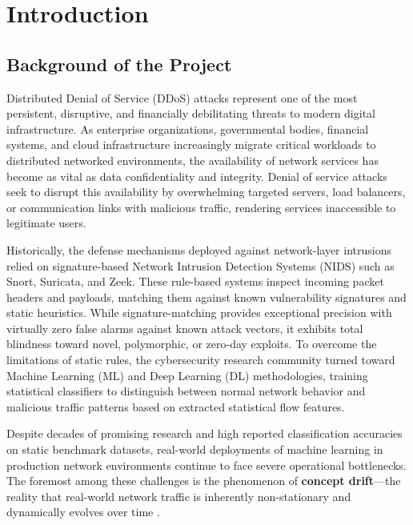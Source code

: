 \documentclass[12pt,a4paper,oneside]{report}
\begin{document}
\chapter{Introduction}
\label{chap:introduction}

\section{Background of the Project}
Distributed Denial of Service (DDoS) attacks represent one of the most persistent, disruptive, and financially debilitating threats to modern digital infrastructure. As enterprise organizations, governmental bodies, financial systems, and cloud infrastructure increasingly migrate critical workloads to distributed networked environments, the availability of network services has become as vital as data confidentiality and integrity. Denial of service attacks seek to disrupt this availability by overwhelming targeted servers, load balancers, or communication links with malicious traffic, rendering services inaccessible to legitimate users.

Historically, the defense mechanisms deployed against network-layer intrusions relied on signature-based Network Intrusion Detection Systems (NIDS) such as Snort, Suricata, and Zeek. These rule-based systems inspect incoming packet headers and payloads, matching them against known vulnerability signatures and static heuristics. While signature-matching provides exceptional precision with virtually zero false alarms against known attack vectors, it exhibits total blindness toward novel, polymorphic, or zero-day exploits. To overcome the limitations of static rules, the cybersecurity research community turned toward Machine Learning (ML) and Deep Learning (DL) methodologies, training statistical classifiers to distinguish between normal network behavior and malicious traffic patterns based on extracted statistical flow features.

Despite decades of promising research and high reported classification accuracies on static benchmark datasets, real-world deployments of machine learning in production network environments continue to face severe operational bottlenecks. The foremost among these challenges is the phenomenon of \textbf{concept drift}---the reality that real-world network traffic is inherently non-stationary and dynamically evolves over time \cite{gama2014}.
\end{document}
